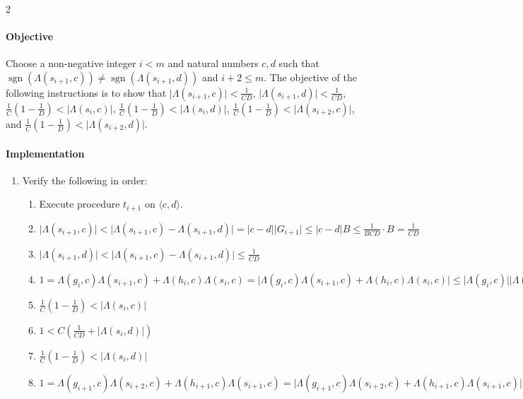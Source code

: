 \documentclass{article}
\DeclareMathOperator{\sgn}{sgn}
\newcounter{procedure}[part]
\begin{document}
\begin{multicols}{2}
				\paragraph{Objective}
					Choose a non-negative integer $i<m$ and natural numbers $c,d$ such that $\sgn(\Lambda(s_{i+1},c))\ne\sgn(\Lambda(s_{i+1},d))$ and $i+2\le m$. The objective of the following instructions is to show that $\lvert\Lambda(s_{i+1},c)\rvert<\frac{1}{CD}$, $\lvert\Lambda(s_{i+1},d)\rvert<\frac{1}{CD}$, $\frac{1}{C}(1-\frac{1}{D})<\lvert\Lambda(s_{i},c)\rvert$, $\frac{1}{C}(1-\frac{1}{D})<\lvert\Lambda(s_{i},d)\rvert$, $\frac{1}{C}(1-\frac{1}{D})<\lvert\Lambda(s_{i+2},c)\rvert$, and $\frac{1}{C}(1-\frac{1}{D})<\lvert\Lambda(s_{i+2},d)\rvert$.
				\paragraph{Implementation}
					\begin{enumerate}
						\item Verify the following in order:
						\begin{enumerate}
							\item Execute procedure $t_{i+1}$ on $\langle c,d\rangle$.
							\item $\lvert\Lambda(s_{i+1},c)\rvert<\lvert\Lambda(s_{i+1},c)-\Lambda(s_{i+1},d)\rvert=\lvert c-d\rvert\lvert G_{i+1}\rvert\le\lvert c-d\rvert B\le\frac{1}{BCD}\cdot B=\frac{1}{CD}$
							\item $\lvert\Lambda(s_{i+1},d)\rvert<\lvert\Lambda(s_{i+1},c)-\Lambda(s_{i+1},d)\rvert\le\frac{1}{CD}$
							\item $1=\Lambda(g_{i},c)\Lambda(s_{i+1},c)+\Lambda(h_{i},c)\Lambda(s_{i},c)=\lvert\Lambda(g_{i},c)\Lambda(s_{i+1},c)+\Lambda(h_{i},c)\Lambda(s_{i},c)\rvert\le\lvert\Lambda(g_{i},c)\rvert\lvert\Lambda(s_{i+1},c)\rvert+\lvert\Lambda(h_{i},c)\rvert\lvert\Lambda(s_{i},c)\rvert<C(\frac{1}{CD}+\lvert\Lambda(s_{i},c)\rvert)$
							\item $\frac{1}{C}(1-\frac{1}{D})<\lvert\Lambda(s_{i},c)\rvert$
							\item $1<C(\frac{1}{CD}+\lvert\Lambda(s_{i},d)\rvert)$
							\item $\frac{1}{C}(1-\frac{1}{D})<\lvert\Lambda(s_{i},d)\rvert$
							\item $1=\Lambda(g_{i+1},c)\Lambda(s_{i+2},c)+\Lambda(h_{i+1},c)\Lambda(s_{i+1},c)=\lvert\Lambda(g_{i+1},c)\Lambda(s_{i+2},c)+\Lambda(h_{i+1},c)\Lambda(s_{i+1},c)\rvert\le\lvert\Lambda(g_{i+1},c)\rvert\lvert\Lambda(s_{i+2},c)\rvert+\lvert\Lambda(h_{i+1},c)\rvert\lvert\Lambda(s_{i+1},c)\rvert<C(\lvert\Lambda(s_{i+2},c)\rvert+\frac{1}{CD})$

\end{enumerate}
\end{enumerate}
\end{multicols}
\end{document}
